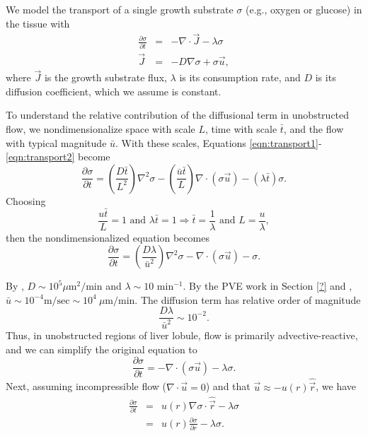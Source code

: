 \documentclass[smallextended,natbib]{svjour3}
\newcommand{\beqa}{\begin{eqnarray}}
\newcommand{\beq}{\begin{equation}}
\newcommand{\eeqa}{\end{eqnarray}}
\newcommand{\eeq}{\end{equation}}
\newcommand{\micron}{\mu\textrm{m}}
\newcommand{\hatvec}[1]{\hat{\vec{#1}}}
\begin{document}
We model the transport of a single growth substrate $\sigma$ 
(e.g., oxygen or glucose) in the tissue with 
\beqa
\frac{ \partial \sigma }{\partial t} & = & 
-\nabla \cdot \vec{J} - \lambda \sigma \label{eqn:transport1}  \\
\vec{J} &  = & -D \nabla \sigma + \sigma \vec{u} \label{eqn:transport2} , 
\eeqa
where $\vec{J}$ is the growth substrate flux, $\lambda$ is its 
consumption rate, and $D$ is its diffusion coefficient, which 
we assume is constant. 

To understand the relative contribution of the diffusional 
term in unobstructed flow, we nondimensionalize space with scale $L$, time 
with scale $\bar{t}$, and the flow with typical magnitude  
$\bar{u}$. With these scales, 
Equations \ref{eqn:transport1}-\ref{eqn:transport2} 
become 
\beq
\frac{ \partial  \sigma}{\partial t}  =  
\left( \frac{ D \bar t}{ L^2 } \right) \nabla^2 \sigma  
- \left(  \frac{\bar{u} \bar{t} }{L} \right)
\nabla \cdot \left( \sigma \vec{u} \right) 
 - \left( \lambda \bar{t} \right) \sigma. 
\eeq
Choosing 
\beq
\frac{ u \bar{t}}{L } = 1 \textrm{ and } \lambda \bar{t} = 1 
\Longrightarrow \bar{t} = \frac{1}{\lambda} \textrm{ and } 
L = \frac{ u }{ \lambda }, 
\eeq
then the nondimensionalized equation becomes 
\beq
\frac{ \partial  \sigma}{\partial t}  =  
\left( \frac{ D \lambda }{ \bar{u}^2 } \right) \nabla^2 \sigma  
- \nabla \cdot \left( \sigma \vec{u} \right) - \sigma . 
\eeq

By \citep{ghaffarizadeh15_bioinformatics}, 
$D \sim 10^5 \micron^2 / \textrm{min}$ and 
$\lambda \sim 10 \textrm{ min}^{-1}$. 
By the PVE work in Section \ref{?} and \citep{nishii}, 
$\bar{u} \sim 10^{-4} \textrm{m}/\textrm{sec} 
\sim 10^4 \:\micron/\textrm{min}$.  
The diffusion term has relative order of magnitude 
\beq
\frac{ D \lambda }{ \bar{u}^2}  \sim 10^{-2}. 
\eeq
Thus, in unobstructed regions of liver lobule, flow is primarily advective-reactive, and we can simplify the original equation  to 
\beq
\frac{ \partial \sigma }{ \partial t} = -\nabla \cdot \left( \sigma \vec{u} \right) - \lambda \sigma. 
\eeq
Next, assuming incompressible flow ($\nabla \cdot \vec{u} = 0$) and 
that $\vec{u} \approx - u(r) \hatvec{r}$, we have 
\beqa
\frac{\partial \sigma}{\partial t} & =& 
u(r) \nabla \sigma \cdot \hatvec{r} - \lambda \sigma \\
 & = & 
u(r) \frac{ \partial \sigma}{\partial r} - \lambda \sigma.  
\eeqa
\end{document}
